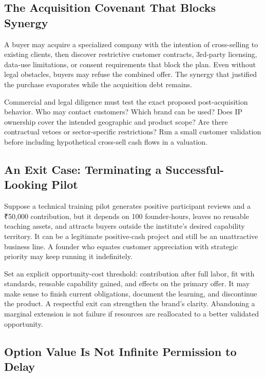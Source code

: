 \subsection{The Acquisition Covenant That Blocks Synergy}
\label{sec:acquisition_covenant_blocks_synergy}

A buyer may acquire a specialized company with the intention of cross-selling to existing clients, then discover restrictive customer contracts, 3rd-party licensing, data-use limitations, or consent requirements that block the plan. Even without legal obstacles, buyers may refuse the combined offer. The synergy that justified the purchase evaporates while the acquisition debt remains.

Commercial and legal diligence must test the exact proposed post-acquisition behavior. Who may contact customers? Which brand can be used? Does IP ownership cover the intended geographic and product scope? Are there contractual vetoes or sector-specific restrictions? Run a small customer validation before including hypothetical cross-sell cash flows in a valuation.

\subsection{An Exit Case: Terminating a Successful-Looking Pilot}
\label{sec:exit_case_terminating_successful_pilot}

Suppose a technical training pilot generates positive participant reviews and a ₹50,000 contribution, but it depends on 100 founder-hours, leaves no reusable teaching assets, and attracts buyers outside the institute's desired capability territory. It can be a legitimate positive-cash project and still be an unattractive business line. A founder who equates customer appreciation with strategic priority may keep running it indefinitely.

Set an explicit opportunity-cost threshold: contribution after full labor, fit with standards, reusable capability gained, and effects on the primary offer. It may make sense to finish current obligations, document the learning, and discontinue the product. A respectful exit can strengthen the brand's clarity. Abandoning a marginal extension is not failure if resources are reallocated to a better validated opportunity.

\subsection{Option Value Is Not Infinite Permission to Delay}
\label{sec:option_value_not_infinite_delay}

